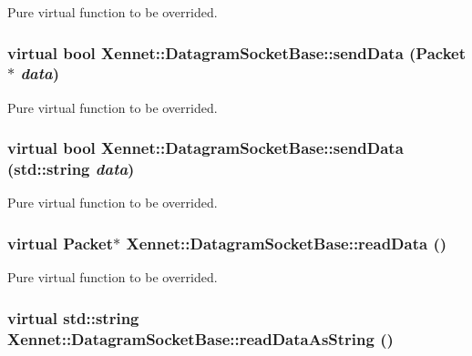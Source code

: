 Pure virtual function to be overrided. 

\hypertarget{classXennet_1_1DatagramSocketBase_9308e21ac58ded6b1e317fa8b112e97e}{
\subsubsection{\setlength{\rightskip}{0pt plus 5cm}virtual bool Xennet::DatagramSocketBase::sendData (Packet $\ast$ {\em data})}}
\label{classXennet_1_1DatagramSocketBase_9308e21ac58ded6b1e317fa8b112e97e}


Pure virtual function to be overrided. 

\hypertarget{classXennet_1_1DatagramSocketBase_c84e1f2bd85653a0a425190254bb5d3d}{
\subsubsection{\setlength{\rightskip}{0pt plus 5cm}virtual bool Xennet::DatagramSocketBase::sendData (std::string {\em data})}}
\label{classXennet_1_1DatagramSocketBase_c84e1f2bd85653a0a425190254bb5d3d}


Pure virtual function to be overrided. 

\hypertarget{classXennet_1_1DatagramSocketBase_98167a14039e4074f0de02f5c4f08446}{
\subsubsection{\setlength{\rightskip}{0pt plus 5cm}virtual Packet$\ast$ Xennet::DatagramSocketBase::readData ()}}
\label{classXennet_1_1DatagramSocketBase_98167a14039e4074f0de02f5c4f08446}


Pure virtual function to be overrided. 

\hypertarget{classXennet_1_1DatagramSocketBase_0363962c4e5316675de815ede59182bc}{
\subsubsection{\setlength{\rightskip}{0pt plus 5cm}virtual std::string Xennet::DatagramSocketBase::readDataAsString ()}}
\label{classXennet_1_1DatagramSocketBase_0363962c4e5316675de815ede59182bc}


